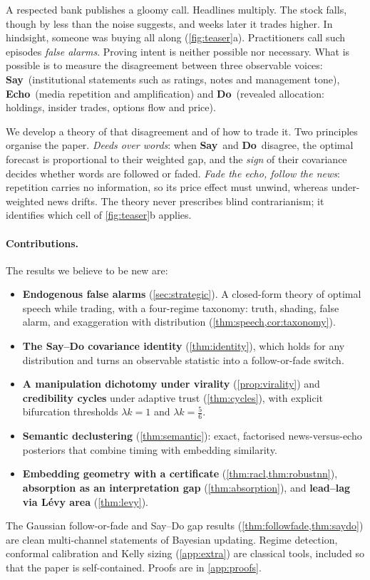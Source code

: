 \documentclass{article}
\theoremstyle{plain}
\theoremstyle{definition}
\theoremstyle{remark}
\newcommand{\SAY}{\textcolor{say}{\textsf{\textbf{Say}}}}
\newcommand{\ECHO}{\textcolor{echo}{\textsf{\textbf{Echo}}}}
\newcommand{\DO}{\textcolor{do}{\textsf{\textbf{Do}}}}
\begin{document}
A respected bank publishes a gloomy call. Headlines multiply. The stock falls, though by less than the noise suggests, and weeks later it trades higher. In hindsight, someone was buying all along (\cref{fig:teaser}a). Practitioners call such episodes \emph{false alarms}. Proving intent is neither possible nor necessary. What is possible is to measure the disagreement between three observable voices: \SAY\ (institutional statements such as ratings, notes and management tone), \ECHO\ (media repetition and amplification) and \DO\ (revealed allocation: holdings, insider trades, options flow and price).

We develop a theory of that disagreement and of how to trade it. Two principles organise the paper. \emph{Deeds over words}: when \SAY\ and \DO\ disagree, the optimal forecast is proportional to their weighted gap, and the \emph{sign} of their covariance decides whether words are followed or faded. \emph{Fade the echo, follow the news}: repetition carries no information, so its price effect must unwind, whereas under-weighted news drifts. The theory never prescribes blind contrarianism; it identifies which cell of \cref{fig:teaser}b applies.

\paragraph{Contributions.} The results we believe to be new are:
\begin{itemize}
  \item \textbf{Endogenous false alarms} (\cref{sec:strategic}). A closed-form theory of optimal speech while trading, with a four-regime taxonomy: truth, shading, false alarm, and exaggeration with distribution (\cref{thm:speech,cor:taxonomy}).
  \item \textbf{The Say--Do covariance identity} (\cref{thm:identity}), which holds for any distribution and turns an observable statistic into a follow-or-fade switch.
  \item \textbf{A manipulation dichotomy under virality} (\cref{prop:virality}) and \textbf{credibility cycles} under adaptive trust (\cref{thm:cycles}), with explicit bifurcation thresholds $\lambda k=1$ and $\lambda k=\tfrac56$.
  \item \textbf{Semantic declustering} (\cref{thm:semantic}): exact, factorised news-versus-echo posteriors that combine timing with embedding similarity.
  \item \textbf{Embedding geometry with a certificate} (\cref{thm:racl,thm:robustnn}), \textbf{absorption as an interpretation gap} (\cref{thm:absorption}), and \textbf{lead--lag via L\'evy area} (\cref{thm:levy}).
\end{itemize}
The Gaussian follow-or-fade and Say--Do gap results (\cref{thm:followfade,thm:saydo}) are clean multi-channel statements of Bayesian updating. Regime detection, conformal calibration and Kelly sizing (\cref{app:extra}) are classical tools, included so that the paper is self-contained. Proofs are in \cref{app:proofs}.
\end{document}
